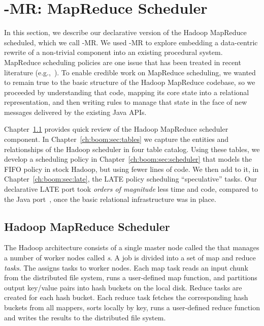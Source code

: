\section{\BOOM-MR: MapReduce Scheduler}
\label{ch:boom:sec:port}

In this section, we describe our declarative version of the Hadoop MapReduce
scheduled, which we call \BOOM-MR.  We used \BOOM-MR to explore embedding a
data-centric rewrite of a non-trivial component into an existing procedural
system.  MapReduce scheduling policies are one issue that has been treated in
recent literature (e.g.,~\cite{zaharia-late,delay-sched}).  To enable credible
work on MapReduce scheduling, we wanted to remain true to the basic structure
of the Hadoop MapReduce codebase, so we proceeded by understanding that code,
mapping its core state into a relational representation, and then writing
\OVERLOG rules to manage that state in the face of new messages delivered by
the existing Java APIs.  

Chapter~\ref{ch:boom:sec:hadoop} provides quick review of the Hadoop MapReduce
scheduler component.  In Chapter~\ref{ch:boom:sec:tables} we capture the
entities and relationships of the Hadoop scheduler in four table catalog.
Using these tables, we develop a scheduling policy in
Chapter~\ref{ch:boom:sec:scheduler} that models the FIFO policy in stock
Hadoop, but using fewer lines of code.  We then add to it, in
Chapter~\ref{ch:boom:sec:late}, the LATE policy scheduling ``speculative''
tasks.  Our declarative LATE port took {\em orders of magnitude} less time and
code, compared to the Java port~\cite{jira-2141}, once the basic relational
infrastructure was in place.

\subsection{Hadoop MapReduce Scheduler}
\label{ch:boom:sec:hadoop}

The Hadoop architecture consists of a single master node called the \emph{\JT}
that manages a number of worker nodes called \emph{{\TT}s}.  A job is divided
into a set of map and reduce \emph{tasks}.  The {\JT} assigns tasks to worker
nodes.  Each map task reads an input chunk from the distributed file system,
runs a user-defined map function, and partitions output key/value pairs into
hash buckets on the local disk.  Reduce tasks are created for each hash bucket.
Each reduce task fetches the corresponding hash buckets from all mappers, sorts
locally by key, runs a user-defined reduce function and writes the results to
the distributed file system.

